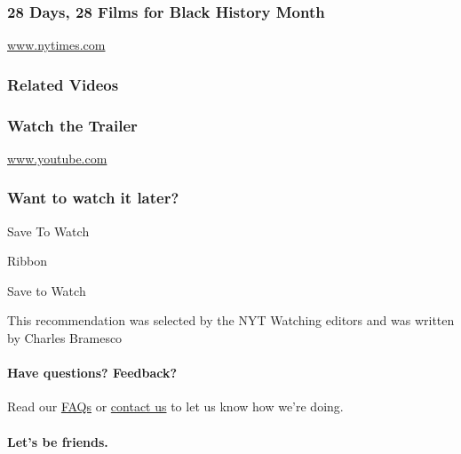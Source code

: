 \hypertarget{28-days-28-films-for-black-history-month}{%
\subsubsection{28 Days, 28 Films for Black History
Month}\label{28-days-28-films-for-black-history-month}}

\href{http://www.nytimes.com}{www.nytimes.com}

\hypertarget{related-videos}{%
\subsubsection{Related Videos}\label{related-videos}}

\href{https://www.youtube.com/watch?v=hnnv5BsNxTM}{}

\hypertarget{watch-the-trailer}{%
\subsubsection{Watch the Trailer}\label{watch-the-trailer}}

\href{http://www.youtube.com}{www.youtube.com}

\hypertarget{want-to-watch-it-later}{%
\subsubsection{Want to watch it later?}\label{want-to-watch-it-later}}

Save To Watch

Ribbon

Save to Watch

This recommendation was selected by the NYT Watching editors and was
written by Charles Bramesco

\hypertarget{have-questions-feedback}{%
\paragraph{Have questions? Feedback?}\label{have-questions-feedback}}

Read our \href{//www.nytimes.com/2017/01/10/watching/faq.html}{FAQs} or
\href{mailto:watchingcare@nytimes.com}{contact us} to let us know how
we're doing.

\hypertarget{lets-be-friends}{%
\paragraph{Let's be friends.}\label{lets-be-friends}}

